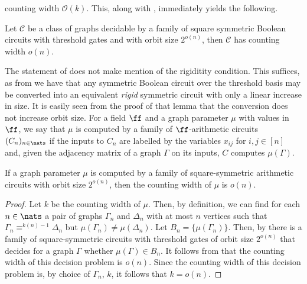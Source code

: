 \documentclass{toc}
\begin{document}
counting width $\mathcal{O}(k)$. This, along with
, immediately yields the following.
\begin{theorem}
  Let $\mathcal{C}$ be a class of graphs decidable by a family of square
  symmetric Boolean circuits with threshold gates and with orbit size $2^{o(n)}$, then
  $\mathcal{C}$ has counting width $o(n)$.
  \label{thm:cw-graphs}
\end{theorem}
The statement of  does not make mention of the rigiditity condition. This suffices, as from \cite[Lemma~7]{AndersonD17} we have that any symmetric Boolean circuit over the threshold basis may be converted into an equivalent \emph{rigid} symmetric circuit with only a linear increase in size.  It is easily seen from the proof of that lemma that the conversion does not increase orbit size.
For a field $\ff$ and a graph parameter $\mu$ with values in $\ff$, we say that $\mu$ is computed by a family of $\ff$-arithmetic circuits $(C_n)_{n \in \nats}$ if the inputs to $C_n$ are labelled by the variables $x_{ij}$ for $i,j \in [n]$ and,  given the adjacency matrix of a graph $\Gamma$ on its inputs, $C$ computes $\mu(\Gamma)$.
\begin{corollary}
  If a graph parameter $\mu$ is computed by a
%
family of square-symmetric %
arithmetic circuits with orbit size $2^{o(n)}$,
then the counting width of $\mu$ is $o(n)$.
  \label{cor:arithmetic-supports-square}
\end{corollary}
\begin{proof}
  Let $k$ be the counting width of $\mu$.  Then, by definition, we can find for each $n \in  \nats$ a pair of graphs $\Gamma_n$ and $\Delta_n$ with at most $n$ vertices such that
  $\Gamma_n \equiv^{k(n) - 1} \Delta_n$ but $\mu (\Gamma_n) \neq \mu(\Delta_n)$.  Let $B_n =
  \{\mu(\Gamma_n)\}$.  Then, by   there 
is a family of
  square-symmetric circuits with threshold gates of orbit size $2^{o(n)}$
  that decides for a graph $\Gamma$
  whether $\mu (\Gamma) \in B_n$.   It follows from  that
  the counting width of this decision problem is $o(n)$.  Since the counting
  width of this decision problem is, by choice of $\Gamma_n$, $k$, it follows that
  $k = o(n)$.
\end{proof}
\end{document}
